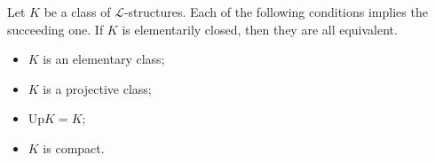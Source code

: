 Let $K$ be a class of $\mathcal{L}$-structures. Each of the following conditions implies the succeeding one. If $K$ is elementarily closed, then they are all equivalent.
\begin{itemize}
\item[(i)] $K$ is an elementary class;
\item[(ii)] $K$ is a projective class;
\item[(iii)] $\text{Up}K = K$;
\item[(iv)] $K$ is compact.
\end{itemize}
